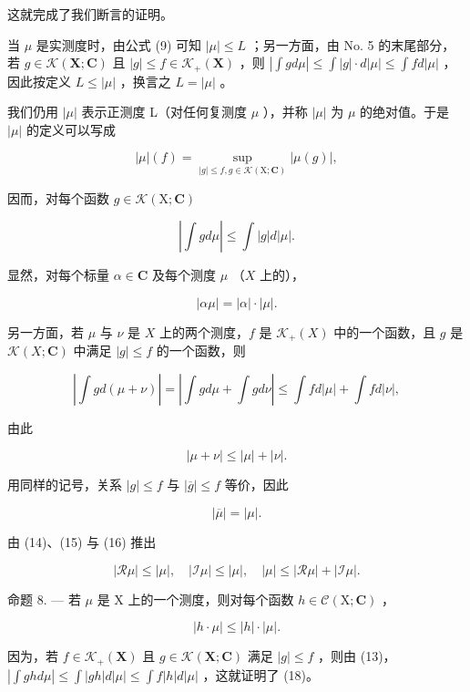 这就完成了我们断言的证明。

当 \(\mu\) 是实测度时，由公式 (9) 可知 \(|\mu| \leqslant L\) ；另一方面，由 No. 5 的末尾部分，若 \(g \in \mathcal{K}(\mathbf{X}; \mathbf{C})\) 且 \(|g| \leqslant f \in \mathcal{K}_{+}(\mathbf{X})\) ，则 \(|\int g d\mu| \leqslant \int |g| \cdot d|\mu| \leqslant \int f d|\mu|\) ，因此按定义 \(L \leqslant |\mu|\) ，换言之 \(L = |\mu|\) 。

我们仍用 \(|\mu|\) 表示正测度 L（对任何复测度 \(\mu\) ），并称 \(|\mu|\) 为 \(\mu\) 的绝对值。于是 \(|\mu|\) 的定义可以写成

\[
| \mu | (f) = \sup _ {| g | \leqslant f, g \in \mathcal{K} (\mathrm{X}; \mathbf {C})} | \mu (g) |,\tag{12}
\]

因而，对每个函数 \(g \in \mathcal{K}(\mathrm{X};\mathbf{C})\)

\[
\left| \int g d \mu \right| \leqslant \int | g | d | \mu |.\tag{13}
\]

显然，对每个标量 \(\alpha \in \mathbf{C}\) 及每个测度 \(\mu\) （\(X\) 上的），

\[
| \alpha \mu | = | \alpha | \cdot | \mu |.\tag{14}
\]

另一方面，若 \(\mu\) 与 \(\nu\) 是 \(X\) 上的两个测度，\(f\) 是 \(\mathcal{K}_{+}(X)\) 中的一个函数，且 \(g\) 是 \(\mathcal{K}(X; \mathbf{C})\) 中满足 \(|g| \leqslant f\) 的一个函数，则

\[
\left| \int g d (\mu + \nu) \right| = \left| \int g d \mu + \int g d \nu \right| \leqslant \int f d | \mu | + \int f d | \nu |,
\]

由此

\[
| \mu + \nu | \leqslant | \mu | + | \nu |.\tag{15}
\]

用同样的记号，关系 \(|g| \leqslant f\) 与 \(|\overline{g}| \leqslant f\) 等价，因此

\[
| \overline {{{\mu}}} | = | \mu |.\tag{16}
\]

由 (14)、(15) 与 (16) 推出

\[
| \mathcal {R} \mu | \leqslant | \mu |, \quad | \mathcal {I} \mu | \leqslant | \mu |, \quad | \mu | \leqslant | \mathcal {R} \mu | + | \mathcal {I} \mu |.\tag{17}
\]

命题 8. --- 若 \(\mu\) 是 X 上的一个测度，则对每个函数 \(h \in \mathcal{C}(\mathrm{X};\mathbf{C})\) ，

\[
\left| h \cdot \mu \right| \leqslant \left| h \right| \cdot \left| \mu \right|.\tag{18}
\]

因为，若 \(f \in \mathcal{K}_+(\mathbf{X})\) 且 \(g \in \mathcal{K}(\mathbf{X};\mathbf{C})\) 满足 \(|g| \leqslant f\) ，则由 (13)，\(|\int gh d\mu| \leqslant \int |gh| d|\mu| \leqslant \int f|h| d|\mu|\) ，这就证明了 (18)。

